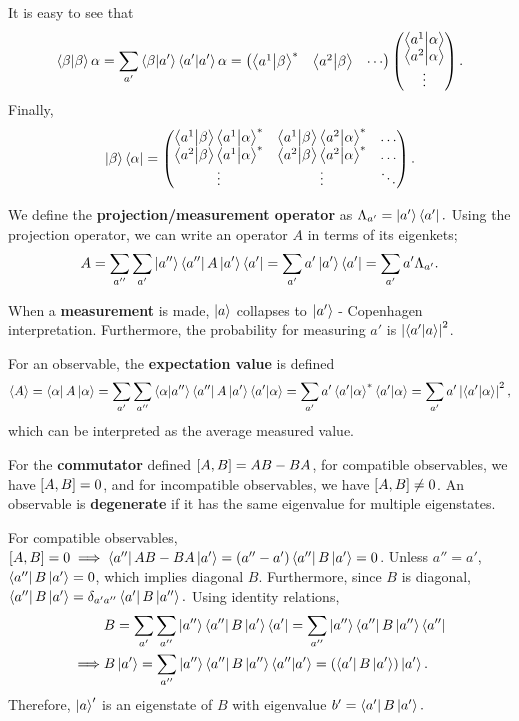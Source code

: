 \documentclass{article}
\begin{document}
It is easy to see that 
$$\braket\beta\alpha=\sum_{a'}\braket{\beta}{a'}\braket{a'}\alpha=\begin{pmatrix}\braket{a^1}{\beta}^*&\braket{a^2}{\beta}&\cdots\end{pmatrix}\begin{pmatrix}\braket{a^1}{\alpha}\\\braket{a^2}{\alpha}\\\vdots\end{pmatrix}.$$
Finally,
$$\ket\beta\bra\alpha=\begin{pmatrix}\braket{a^1}{\beta}\braket{a^1}{\alpha}^*&\braket{a^1}{\beta}\braket{a^2}{\alpha}^*&\hdots\\\braket{a^2}{\beta}\braket{a^1}{\alpha}^*&\braket{a^2}{\beta}\braket{a^2}{\alpha}^*&\hdots\\\vdots&\vdots&\ddots\end{pmatrix}.$$

We define the \textbf{projection/measurement operator} as $\Lambda_{a'}=\ket{a'}\bra{a'}.$ Using the projection operator, we can write an operator $A$ in terms of its eigenkets; 
$$A=\sum_{a''}\sum_{a'}\ket{a''}\bra{a''}A\ket{a'}\bra{a'}=\sum_{a'}a'\ket{a'}\bra{a'}=\sum_{a'}a'\Lambda_{a'}.$$

When a \textbf{measurement} is made, $\ket a$ collapses to $\ket{a'}$ - Copenhagen interpretation. Furthermore, the probability for measuring $a'$ is $\left\lvert\braket{a'}{a}\right\rvert^2$. 

For an observable, the \textbf{expectation value} is defined
$$\ev A=\bra\alpha A\ket\alpha=\sum_{a'}\sum_{a''}\braket{\alpha}{a''}\bra{a''}A\ket{a'}\braket{a'}{\alpha}=\sum_{a'}a'\braket{a'}{\alpha}^*\braket{a'}{\alpha}=\sum_{a'}a'\abs{\braket{a'}{\alpha}}^2,$$
which can be interpreted as the average measured value.

For the \textbf{commutator} defined $\comm{A}{B}=AB-BA$, for compatible observables, we have $\comm{A}{B}=0$, and for incompatible observables, we have $\comm{A}{B}\ne 0$. An observable is \textbf{degenerate} if it has the same eigenvalue for multiple eigenstates.


For compatible observables, $\comm{A}{B}=0\implies\bra{a''}AB-BA\ket{a'}=(a''-a')\bra{a''}B\ket{a'}=0$. Unless $a''=a'$, $\bra{a''}B\ket{a'}=0$, which implies diagonal $B$. Furthermore, since $B$ is diagonal, $\bra{a''}B\ket{a'}=\delta_{a'a''}\bra{a'}B\ket{a''}.$ Using identity relations, 
\begin{align*}
    &B=\sum_{a'}\sum_{a''}\ket{a''}\bra{a''}B\ket{a'}\bra{a'}=\sum_{a''}\ket{a''}\bra{a''}B\ket{a''}\bra{a''}\\
    \implies &B\ket{a'}=\sum_{a''}\ket{a''}\bra{a''}B\ket{a''}\braket{a''}{a'}=(\bra{a'}B\ket{a'})\ket{a'}.
\end{align*}
Therefore, $\ket a'$ is an eigenstate of $B$ with eigenvalue $b'=\bra{a'}B\ket{a'}.$
\end{document}
